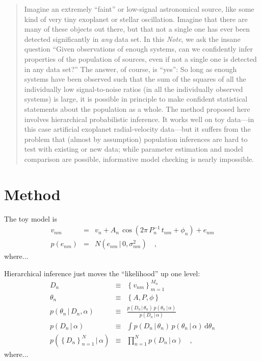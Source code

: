 \documentclass[12pt]{article}
\newcommand{\documentname}{\textsl{Note}}
\newcommand{\given}{\,|\,}
\newcommand{\dd}{\mathrm{d}}
\newcommand{\pdf}{p}
\newcommand{\setof}[1]{\left\{{#1}\right\}}
\newcommand{\data}{D_n}
\newcommand{\setofalldata}{\setof{\data}_{n=1}^N}
\newcommand{\parsymbol}{\theta}
\newcommand{\pars}{\parsymbol_n}
\newcommand{\hyperpars}{\alpha}
\newcommand{\amp}{A}
\newcommand{\period}{P}
\newcommand{\phase}{\phi}
\newcommand{\normal}{N}
\begin{document}
\begin{abstract}
Imagine an extremely ``faint'' or low-signal astronomical source, like
some kind of very tiny exoplanet or stellar oscillation.  Imagine that
there are many of these objects out there, but that not a single one
has ever been detected significantly in \emph{any} data set.  In this
\documentname, we ask the insane question ``Given observations of
enough systems, can we confidently infer properties of the population
of sources, even if not a single one is detected in any data set?''
The answer, of course, is ``yes'': So long as enough systems have been
observed such that the sum of the squares of all the individually low
signal-to-noise ratios (in all the individually observed systems) is
large, it is possible in principle to make confident statistical
statements about the population as a whole.  The method proposed here
involves hierarchical probabilistic inference.  It works well on toy
data---in this case artificial exoplanet radial-velocity data---but it
suffers from the problem that (almost by assumption) population
inferences are hard to test with existing or new data; while parameter
estimation and model comparison are possible, informative model
checking is nearly impossible.
\end{abstract}

\section{Method}

The toy model is
\begin{eqnarray}
v_{nm}
  &=&
v_n + \amp_n\,\cos(2\pi\,\period_n^{-1}\,t_{nm} + \phase_n) + e_{nm}
\\
p(e_{nm})
  &=&
\normal(e_{nm}\given 0,\sigma_{nm}^2)
\quad,
\end{eqnarray}
where...

Hierarchical inference just moves the ``likelihood'' up one level:
\begin{eqnarray}
\data
  &\equiv&
\setof{v_{nm}}_{m=1}^{M_n}
\\
\pars
  &\equiv&
\setof{\amp, \period, \phase}
\\
\pdf(\pars\given\data,\hyperpars)
  &\equiv&
\frac{\pdf(\data\given\pars)\,\pdf(\pars\given\hyperpars)}{\pdf(\data\given\hyperpars)}
\\
\pdf(\data\given\hyperpars)
  &\equiv&
\int \pdf(\data\given\pars)\,\pdf(\pars\given\hyperpars)\,\dd\pars
\\
\pdf(\setofalldata\given\hyperpars)
  &\equiv&
\prod_{n=1}^N \pdf(\data\given\hyperpars)
\quad,
\end{eqnarray}
where...
\end{document}
